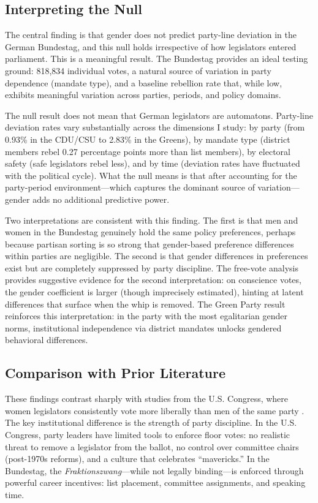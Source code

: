 \documentclass[12pt]{article}
\begin{document}
\subsection{Interpreting the Null}

The central finding is that gender does not predict party-line deviation in the German Bundestag, and this null holds irrespective of how legislators entered parliament. This is a meaningful result. The Bundestag provides an ideal testing ground: 818,834 individual votes, a natural source of variation in party dependence (mandate type), and a baseline rebellion rate that, while low, exhibits meaningful variation across parties, periods, and policy domains.

The null result does not mean that German legislators are automatons. Party-line deviation rates vary substantially across the dimensions I study: by party (from 0.93\% in the CDU/CSU to 2.83\% in the Greens), by mandate type (district members rebel 0.27 percentage points more than list members), by electoral safety (safe legislators rebel less), and by time (deviation rates have fluctuated with the political cycle). What the null means is that after accounting for the party-period environment---which captures the dominant source of variation---gender adds no additional predictive power.

Two interpretations are consistent with this finding. The first is that men and women in the Bundestag genuinely hold the same policy preferences, perhaps because partisan sorting is so strong that gender-based preference differences within parties are negligible. The second is that gender differences in preferences exist but are completely suppressed by party discipline. The free-vote analysis provides suggestive evidence for the second interpretation: on conscience votes, the gender coefficient is larger (though imprecisely estimated), hinting at latent differences that surface when the whip is removed. The Green Party result reinforces this interpretation: in the party with the most egalitarian gender norms, institutional independence via district mandates unlocks gendered behavioral differences.

\subsection{Comparison with Prior Literature}

These findings contrast sharply with studies from the U.S. Congress, where women legislators consistently vote more liberally than men of the same party \citep{frederick2009, anzia2011}. The key institutional difference is the strength of party discipline. In the U.S. Congress, party leaders have limited tools to enforce floor votes: no realistic threat to remove a legislator from the ballot, no control over committee chairs (post-1970s reforms), and a culture that celebrates ``mavericks.'' In the Bundestag, the \textit{Fraktionszwang}---while not legally binding---is enforced through powerful career incentives: list placement, committee assignments, and speaking time.
\end{document}
